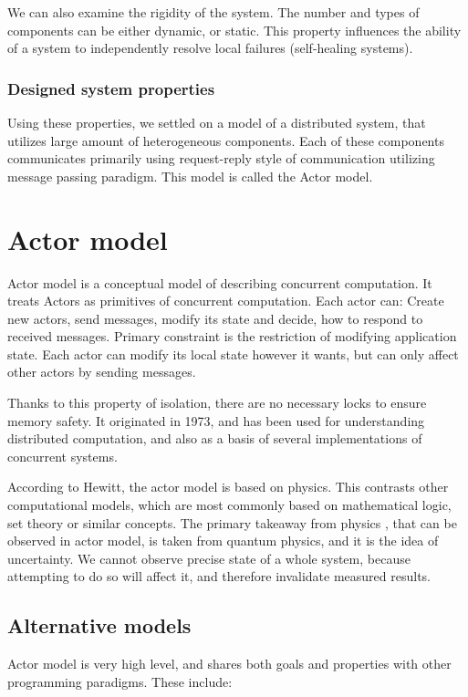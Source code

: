 We can also examine the rigidity of the system. The number and types of components can be either dynamic, or static. This
property influences the ability of a system to independently resolve local failures (self-healing systems).

\subsubsection{Designed system properties}
Using these properties, we settled on a model of a distributed system, that utilizes large amount of heterogeneous components.
Each of these components communicates primarily using request-reply style of communication utilizing message passing paradigm.
This model is called the Actor model.

\section{Actor model}
Actor model is a conceptual model of describing concurrent computation. It treats Actors as primitives of concurrent
computation. Each actor can: Create new actors, send messages, modify its state and decide, how to respond to
received messages. Primary constraint is the restriction of modifying application state.
Each actor can modify its local state however it wants, but can only affect other actors by sending messages.

Thanks to this property of isolation, there are no necessary locks to ensure memory safety.
It originated in 1973, and has been used for understanding distributed computation, and also as
a basis of several implementations of concurrent systems.

According to Hewitt\cite{journal:actor}, the actor model is based on physics. This contrasts
other computational models, which are most commonly based on mathematical logic, set theory or similar concepts.
The primary takeaway from physics , that can be observed in actor model, is taken from quantum physics, and it
is the idea of uncertainty. We cannot observe precise state of a whole system, because attempting to do so
will affect it, and therefore invalidate measured results.

\subsection{Alternative models}
Actor model is very high level, and shares both goals and properties with other programming paradigms. These
include:
